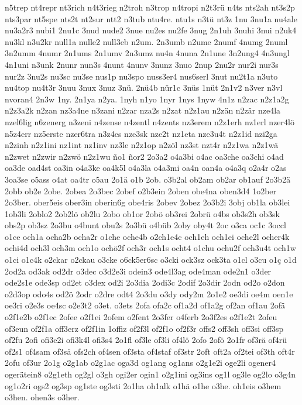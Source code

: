 {n5trep
nt4repr
nt3rich
n4t3rieg
n2troh
n3trop
n4tropi
n2t3rü
n4ts
nts2ah
nt3s2p
nts3par
nt5spe
nts2t
nt2sur
ntt2
n3tub
ntu4re.
ntu1s
n3tü
nt3z
1nu
3nu1a
nu4ale
nu3a2r3
nubi1
2nu1c
3nud
nude2
3nue
nu2es
nu2fe
3nug
2n1uh
3nuhi
3nui
n2uk4
nu3kl
n3u2kr
null1a
nulle2
null3eb
n2um.
2n3umb
n2ume
2numf
4numg
2numl
3n2umm
4numr
2n1ums
2n1umv
2n3umz
nu4n
4nuna
2n1une
3n2ung4
4n3ungl
4n1uni
n3unk
2nunr
nun3s
4nunt
4nunv
3nunz
3nuo
2nup
2nu2r
nur2i
nur3s
nur2z
3nu2s
nu3sc
nu3se
nus1p
nu3spo
nuss3er4
nus6serl
3nut
nu2t1a
n3uto
nu4top
nu4t3r
3nuu
3nux
3nuz
3nü.
2nü4b
nür1c
3nüs
1nüt
2n1v2
n3ver
n3vl
nvoran4
2n3w
1ny.
2n1ya
n2ya.
1nyh
n1yo
1nyr
1nys
1nyw
4n1z
n2zac
n2z1a2g
n2z3a2k
n2zan
nz3a4ne
n3zani
n2zar
nza2s
n2zat
n2z1au
n2zän
n2zär
nze4la
nzel6lig
n6zenerg
n3zeni
n4zense
n4zentl
n4zents
nz3erem
n2z1erh
nz1erl
nzer4lö
n5z4err
nz5erste
nzer6tra
n3z4es
nze3sk
nze2t
nz1eta
nze3u4t
n2z1id
nzi2ga
n2zinh
n2z1ini
nz1int
nz1inv
nz3le
n2z1op
n2zöl
nz3st
nzt4r
n2z1wa
n2z1wä
n2zwet
n2zwir
n2zwö
n2z1wu
ño1
ñor2
2o3a2
o4a3bi
o4ac
oa3che
oa3chi
o4ad
oa3de
oad4st
oa3in
o4a3ke
oa4k5l
o4a3la
o4a3mi
oa4n
oan4a
o4a3q
o2a4r
o2as
3oa3se
o5ass
o4at
oa4tr
o5au
2o1ä
o1b
2ob.
o3b2al
ob2am
ob2ar
ob1auf
2o3b2ä
2obb
ob2e
2obe.
2obea
2o3bec
2obef
o2b3ein
2oben
obe4na
oben3d4
1o2ber
2o3ber.
ober5eis
ober3in
oberin6g
obe4ris
2obev
2obez
2o3b2i
3obj
ob1la
ob3lei
1ob3li
2oblo2
2ob2lö
ob2lu
2obo
ob1or
2obö
ob3rei
2obrü
o4bs
ob3s2h
ob3sk
obs2p
ob3sz
2o3bu
o4bunt
obu2s
2o3bü
o4büb
2oby
oby4t
2oc
o3ca
oc1c
3occl
o1ce
och1a
ocha2b
ocha2r
o1che
oche4b
o2ch1e4c
och1eh
och1ei
oche2l
ocher4k
ochi4d
och3l
och3m
och1o
ochö2f
och3r
och1s
ocht4
o1chu
ochu2f
och3u4t
och1w
o1ci
o1c4k
o2ckar
o2ckau
o3cke
o6ck5er6sc
o3cki
ock3sz
ock3ta
o1cl
o3cu
o1ç
o1d
2od2a
od3ak
od2dr
o3dec
o3d2e3i
odein3
ode4l3ag
ode4man
ode2n1
o3der
ode2s1e
ode3sp
od2et
o3dex
od2i
2o3dia
2odi3c
2odif
2o3dir
2odn
od2o
o2don
o2d3op
odo4s
od2ö
2odr
o2dre
odt4
2o3du
o3dy
ody2m
2o1e2
oe3di
oe4m
oen1e
oe3ri
o2e3s
oe4sc
o2e3t2
o3et.
o3ets
2ofa
ofa2c
of1a2d
of1a2g
of2an
of1au
2ofä
o2f1e2b
o2f1ec
2ofee
o2f1ei
2ofem
o2fent
2o3fer
o4ferb
2o3f2es
o2f1e2t
2ofeu
of3eun
of2f1a
off3erz
of2f1in
1offiz
of2f3l
of2f1o
of2f3r
offs2
off3sh
off3si
off3sp
of2fu
2ofi
ofi3e2i
ofi3k4l
ofi3s4
2o1fl
of3le
of3li
of4lö
2ofo
2ofö
2o1fr
of3rä
of4rü
of2s1
of4sam
of3sä
ofs2ch
of4sen
of3sta
of4staf
of3str
2oft
oft2a
of2tei
of3th
oft4r
2ofu
of3ur
2o1g
o2g1ab
o2g1ac
oga3d
og1ang
og1ans
o2g1e2i
oge2li
ogener4
ogerätein8
o2g1eth
og2gl
o3gh
ogi2er
ogin1
o2g1ini
og3ins
og1l
og3le
og2lo
o3g4n
og1o2ri
ogs2
og3sp
og1ste
og3sti
2o1ha
oh1alk
o1hä
o1he
o3he.
oh1eis
o3hem
o3hen.
ohen3s
o3her.
}
